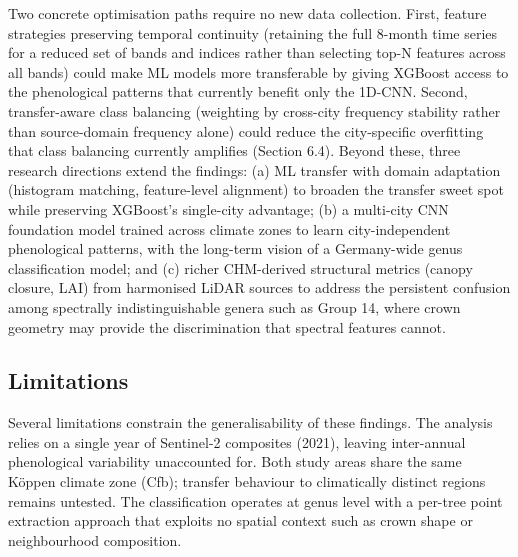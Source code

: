 \documentclass[11pt,a4paper]{scrartcl}
\begin{document}
Two concrete optimisation paths require no new data collection. First,
feature strategies preserving temporal continuity (retaining the full
8-month time series for a reduced set of bands and indices rather than
selecting top-N features across all bands) could make ML models more
transferable by giving XGBoost access to the phenological patterns that
currently benefit only the 1D-CNN. Second, transfer-aware class
balancing (weighting by cross-city frequency stability rather than
source-domain frequency alone) could reduce the city-specific
overfitting that class balancing currently amplifies (Section 6.4).
Beyond these, three research directions extend the findings: (a) ML
transfer with domain adaptation (histogram matching, feature-level
alignment) to broaden the transfer sweet spot while preserving XGBoost's
single-city advantage; (b) a multi-city CNN foundation model trained
across climate zones to learn city-independent phenological patterns,
with the long-term vision of a Germany-wide genus classification model;
and (c) richer CHM-derived structural metrics (canopy closure, LAI) from
harmonised LiDAR sources to address the persistent confusion among
spectrally indistinguishable genera such as Group 14, where crown
geometry may provide the discrimination that spectral features cannot.

\subsection{Limitations}\label{limitations}

Several limitations constrain the generalisability of these findings.
The analysis relies on a single year of Sentinel-2 composites (2021),
leaving inter-annual phenological variability unaccounted for. Both
study areas share the same Köppen climate zone (Cfb); transfer behaviour
to climatically distinct regions remains untested. The classification
operates at genus level with a per-tree point extraction approach that
exploits no spatial context such as crown shape or neighbourhood
composition.
\end{document}
